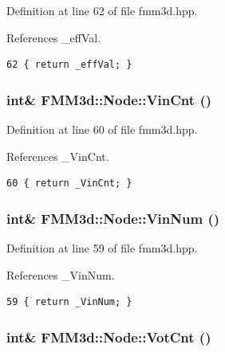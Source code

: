Definition at line 62 of file fmm3d.hpp.

References \_\-eff\-Val.

\footnotesize\begin{verbatim}62 { return _effVal; }
\end{verbatim}\normalsize 


\subsubsection{\setlength{\rightskip}{0pt plus 5cm}int\& FMM3d::Node::Vin\-Cnt ()\hspace{0.3cm}{\tt  [inline]}}\label{classFMM3d_1_1Node_4f9499c6aea34790aeca82a4587d9a1f_4f9499c6aea34790aeca82a4587d9a1f}




Definition at line 60 of file fmm3d.hpp.

References \_\-Vin\-Cnt.

\footnotesize\begin{verbatim}60 { return _VinCnt; }
\end{verbatim}\normalsize 


\subsubsection{\setlength{\rightskip}{0pt plus 5cm}int\& FMM3d::Node::Vin\-Num ()\hspace{0.3cm}{\tt  [inline]}}\label{classFMM3d_1_1Node_6dfec3b683cea3b7c55b64fba81657b5_6dfec3b683cea3b7c55b64fba81657b5}




Definition at line 59 of file fmm3d.hpp.

References \_\-Vin\-Num.

\footnotesize\begin{verbatim}59 { return _VinNum; }
\end{verbatim}\normalsize 


\subsubsection{\setlength{\rightskip}{0pt plus 5cm}int\& FMM3d::Node::Vot\-Cnt ()\hspace{0.3cm}{\tt  [inline]}}\label{classFMM3d_1_1Node_25c7cbb7d0fd512b817dd2b2091e63fe_25c7cbb7d0fd512b817dd2b2091e63fe}




